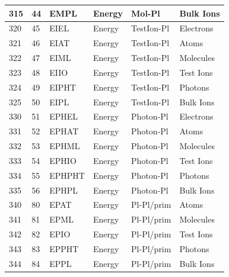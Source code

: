 \documentclass{article}
\begin{document}
\begin{longtable}{|l|l|l|l|l|l|}
315  & 44       & EMPL   & Energy   & Mol-Pl     & Bulk Ions  \\ \hline
320  & 45       & EIEL   & Energy   & TestIon-Pl & Electrons  \\ \hline
321  & 46       & EIAT   & Energy   & TestIon-Pl & Atoms      \\ \hline
322  & 47       & EIML   & Energy   & TestIon-Pl & Molecules  \\ \hline
323  & 48       & EIIO   & Energy   & TestIon-Pl & Test Ions  \\ \hline
324  & 49       & EIPHT  & Energy   & TestIon-Pl & Photons    \\ \hline
325  & 50       & EIPL   & Energy   & TestIon-Pl & Bulk Ions  \\ \hline
330  & 51       & EPHEL  & Energy   & Photon-Pl  & Electrons  \\ \hline
331  & 52       & EPHAT  & Energy   & Photon-Pl  & Atoms      \\ \hline
332  & 53       & EPHML  & Energy   & Photon-Pl  & Molecules  \\ \hline
333  & 54       & EPHIO  & Energy   & Photon-Pl  & Test Ions  \\ \hline
334  & 55       & EPHPHT & Energy   & Photon-Pl  & Photons    \\ \hline
335  & 56       & EPHPL  & Energy   & Photon-Pl  & Bulk Ions  \\ \hline
340  & 80       & EPAT   & Energy   & Pl-Pl/prim & Atoms      \\ \hline
341  & 81       & EPML   & Energy   & Pl-Pl/prim & Molecules  \\ \hline
342  & 82       & EPIO   & Energy   & Pl-Pl/prim & Test Ions  \\ \hline
343  & 83       & EPPHT  & Energy   & Pl-Pl/prim & Photons    \\ \hline
344  & 84       & EPPL   & Energy   & Pl-Pl/prim & Bulk Ions  \\ \hline
\end{longtable}
\end{document}
